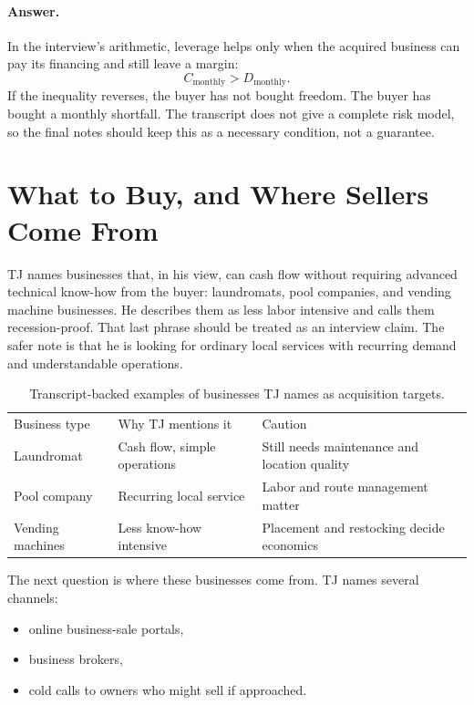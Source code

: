\paragraph{Answer.} In the interview's arithmetic, leverage helps only when the acquired business can pay its financing and still leave a margin:
\begin{equation}
C_{\mathrm{monthly}} > D_{\mathrm{monthly}}.
\end{equation}
If the inequality reverses, the buyer has not bought freedom. The buyer has bought a monthly shortfall. The transcript does not give a complete risk model, so the final notes should keep this as a necessary condition, not a guarantee.

\section{What to Buy, and Where Sellers Come From}

TJ names businesses that, in his view, can cash flow without requiring advanced technical know-how from the buyer: laundromats, pool companies, and vending machine businesses. He describes them as less labor intensive and calls them recession-proof. That last phrase should be treated as an interview claim. The safer note is that he is looking for ordinary local services with recurring demand and understandable operations.

\begin{table}
\centering
\begin{tabular}{lll}
Business type & Why TJ mentions it & Caution \\
Laundromat & Cash flow, simple operations & Still needs maintenance and location quality \\
Pool company & Recurring local service & Labor and route management matter \\
Vending machines & Less know-how intensive & Placement and restocking decide economics \\
\end{tabular}
\caption{Transcript-backed examples of businesses TJ names as acquisition targets.}
\end{table}

The next question is where these businesses come from. TJ names several channels:
\begin{itemize}
\item online business-sale portals,
\item business brokers,
\item cold calls to owners who might sell if approached.
\end{itemize}

